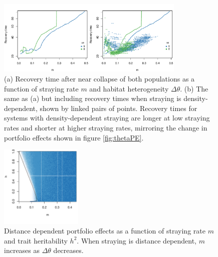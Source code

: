 \documentclass[twocolumn,preprintnumbers,amsmath,amssymb,superscriptaddress]{revtex4}
\begin{document}
\begin{figure}
  \captionsetup{justification=raggedright,
singlelinecheck=false
}
\centering
\includegraphics[width=0.8\textwidth]{figs2/fig_relaxtheta2.pdf}
\caption{
(a) Recovery time after near collapse of both populations as a function of straying rate $m$ and habitat heterogeneity $\Delta\theta$.
(b) The same as (a) but including recovery times when straying is density-dependent, shown by linked pairs of points.
Recovery times for systems with density-dependent straying are longer at low straying rates and shorter at higher straying rates, mirroring the change in portfolio effects shown in figure \ref{fig:thetaPE}.
} \label{fig:relaxtheta}
\end{figure}


\begin{figure}
  \captionsetup{justification=raggedright,
singlelinecheck=false
}
  \centering
  \includegraphics[width=0.35\textwidth]{figs2/fig_MDPE_hm_mtheta_rt.pdf}
  \caption{
  Distance dependent portfolio effects as a function of straying rate $m$ and trait heritability $h^2$. When straying is distance dependent, $m$ increases as $\Delta\theta$ decreases.
  } \label{fig:mthetaPE}
\end{figure}
\end{document}

